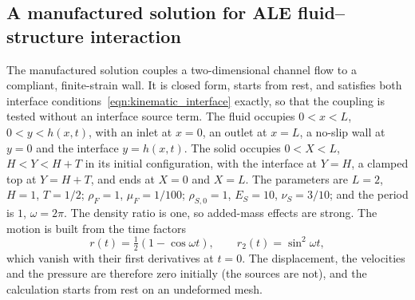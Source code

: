 
\subsection{A manufactured solution for ALE fluid--structure interaction}
\label{sec:mmsc}

The manufactured solution couples a two-dimensional channel flow to a compliant, finite-strain wall.
It is closed form, starts from rest, and satisfies both interface conditions~\eqref{eqn:kinematic_interface} exactly, so that the coupling is tested without an interface source term.
The fluid occupies $0 < x < L$, $0 < y < h(x,t)$, with an inlet at $x = 0$, an outlet at $x = L$, a no-slip wall at $y = 0$ and the interface $y = h(x,t)$.
The solid occupies $0 < X < L$, $H < Y < H + T$ in its initial configuration, with the interface at $Y = H$, a clamped top at $Y = H + T$, and ends at $X = 0$ and $X = L$.
The parameters are $L = 2$, $H = 1$, $T = 1/2$; $\rho_F = 1$, $\mu_F = 1/100$; $\rho_{S,0} = 1$, $E_S = 10$, $\nu_S = 3/10$; and the period is $1$, $\omega = 2\pi$.
The density ratio is one, so added-mass effects are strong.
The motion is built from the time factors
\begin{equation}
  r(t) = \tfrac{1}{2}\left(1 - \cos\omega t\right), \qquad r_2(t) = \sin^2\omega t,
  \label{eq:mmsc_r}
\end{equation}
which vanish with their first derivatives at $t = 0$.
The displacement, the velocities and the pressure are therefore zero initially (the sources are not), and the calculation starts from rest on an undeformed mesh.

